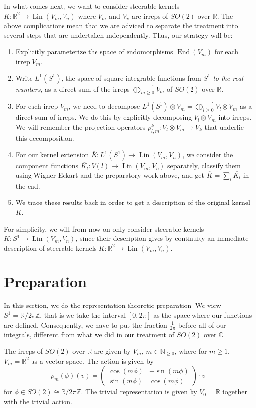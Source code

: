 \documentclass[12pt, a4paper]{article}
\theoremstyle{plain}
\theoremstyle{definition}
\theoremstyle{remark}
\newcommand{\N}{\mathds{N}}
\newcommand{\Z}{\mathds{Z}}
\newcommand{\R}{\mathds{R}}
\newcommand{\C}{\mathds{C}}
\DeclareMathOperator{\lin}{Lin}
\DeclareMathOperator{\End}{End}
\begin{document}
In what comes next, we want to consider steerable kernels $K: \R^2 \to \lin(V_m, V_n)$ where $V_m$ and $V_n$ are irreps of $SO(2)$ over $\R$. The above complications mean that we are adviced to separate the treatment into several steps that are undertaken independently. Thus, our strategy will be:

\begin{enumerate}
\item Explicitly parameterize the space of endomorphisms $\End(V_m)$ for each irrep $V_m$.
\item Write $L^1(S^1)$, the space of square-integrable functions from $S^1$ \emph{to the real numbers}, as a direct sum of the irreps $\widehat{\bigoplus_{m \geq 0}} V_m$ of $SO(2)$ over $\R$.
\item For each irrep $V_m$, we need to decompose $L^1(S^1) \otimes V_m = \widehat{\bigoplus_{l \geq 0}} V_{l} \otimes V_m$ as a direct sum of irreps. We do this by explicitly decomposing $V_{l} \otimes V_m$ into irreps. We will remember the projection operators $p_{l,m}^k: V_{l} \otimes V_m \to V_k$ that underlie this decomposition.
\item For our kernel extension $\overline{K}: L^1(S^1) \to \lin(V_m, V_n)$, we consider the component functions $\overline{K_l}: V(l) \to \lin(V_m, V_n)$ separately, classify them using Wigner-Eckart and the preparatory work above, and get $\overline{K} = \sum_{l}\overline{K_l}$ in the end.
\item We trace these results back in order to get a description of the original kernel $K$.
\end{enumerate}

For simplicity, we will from now on only consider steerable kernels $K: S^1 \to \lin(V_m, V_n)$, since their description gives by continuity an immediate description of steerable kernels $K: \R^2 \to \lin(V_m, V_n)$.

\section{Preparation}

In this section, we do the representation-theoretic preparation. We view $S^1 = \R/{2 \pi \Z}$, that is we take the interval $[0, 2 \pi]$ as the space where our functions are defined. Consequently, we have to put the fraction $\frac{1}{2 \pi}$ before all of our integrals, different from what we did in our treatment of $SO(2)$ over $\C$.

The irreps of $SO(2)$ over $\R$ are given by $V_m$, $m \in \N_{\geq 0}$, where for $m \geq 1$, $V_m = \R^2$ as a vector space. The action is given by
\begin{equation*}
\rho_m(\phi)(v) =
\begin{pmatrix}
\cos(m \phi) & -\sin(m \phi) \\
\sin(m \phi) & \cos(m \phi)
\end{pmatrix} \cdot v
\end{equation*}
for $\phi \in SO(2) \cong \R/{2 \pi \Z}$. The trivial representation is given by $V_0 = \R$ together with the trivial action.
\end{document}

